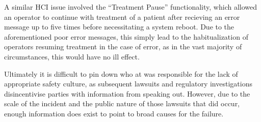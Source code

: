 \documentclass{cshonours}
\begin{document}
A similar HCI issue involved the ``Treatment Pause'' functionality, which allowed an operator to continue with treatment of a patient after recieving an error message up to five times before necessitating a system reboot. Due to the aforementioned poor error messages, this simply lead to the habitualization of operators resuming treatment in the case of error, as in the vast majority of circumstances, this would have no ill effect. \cite[p.~301]{saferworld}

Ultimately it is difficult to pin down who at \aecl was responsible for the lack of appropriate safety culture, as subsequent lawsuits and regulatory investigations disincentivise parties with information from speaking out. However, due to the scale of the incident and the public nature of those lawsuits that did occur, enough information does exist to point to broad causes for the failure.
\end{document}
